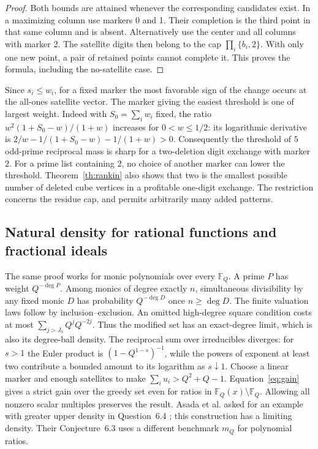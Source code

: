 \begin{proof}
Both bounds are attained whenever the corresponding candidates exist. In a maximizing column use markers 0 and 1. Their completion is the third point in that same column and is absent. Alternatively use the center and all columns with marker 2. The satellite digits then belong to the cap $\prod_i\{b_i,2\}$. With only one new point, a pair of retained points cannot complete it. This proves the formula, including the no-satellite case.
\end{proof}
Since $s_i\le w_i$, for a fixed marker the most favorable sign of the change occurs at the all-ones satellite vector. The marker giving the easiest threshold is one of largest weight. Indeed with $S_0=\sum_iw_i$ fixed, the ratio $w^2(1+S_0-w)/(1+w)$ increases for $0<w\le1/2$: its logarithmic derivative is $2/w-1/(1+S_0-w)-1/(1+w)>0$. Consequently the threshold of $5$ odd-prime reciprocal mass is sharp for a two-deletion digit exchange with marker 2. For a prime list containing 2, no choice of another marker can lower the threshold. Theorem~\ref{th:rankin} also shows that two is the smallest possible number of deleted cube vertices in a profitable one-digit exchange. The restriction concerns the residue cap, and permits arbitrarily many added patterns.

\subsection{Natural density for rational functions and fractional ideals}
The same proof works for monic polynomials over every $\mathbb F_Q$. A prime $P$ has weight $Q^{-\deg P}$. Among monics of degree exactly $n$, simultaneous divisibility by any fixed monic $D$ has probability $Q^{-\deg D}$ once $n\ge\deg D$. The finite valuation laws follow by inclusion--exclusion. An omitted high-degree square condition costs at most $\sum_{j>J_0}Q^jQ^{-2j}$. Thus the modified set has an exact-degree limit, which is also its degree-ball density. The reciprocal sum over irreducibles diverges: for $s>1$ the Euler product is $(1-Q^{1-s})^{-1}$, while the powers of exponent at least two contribute a bounded amount to its logarithm as $s\downarrow1$. Choose a linear marker and enough satellites to make $\sum_i u_i>Q^2+Q-1$. Equation~\eqref{eq:gain} gives a strict gain over the greedy set even for ratios in $\mathbb F_Q(x)\setminus\mathbb F_Q$. Allowing all nonzero scalar multiples preserves the result. Asada et al. asked for an example with greater upper density in Question~6.4 \cite{asada}; this construction has a limiting density. Their Conjecture~6.3 uses a different benchmark $m_Q$ for polynomial ratios.

